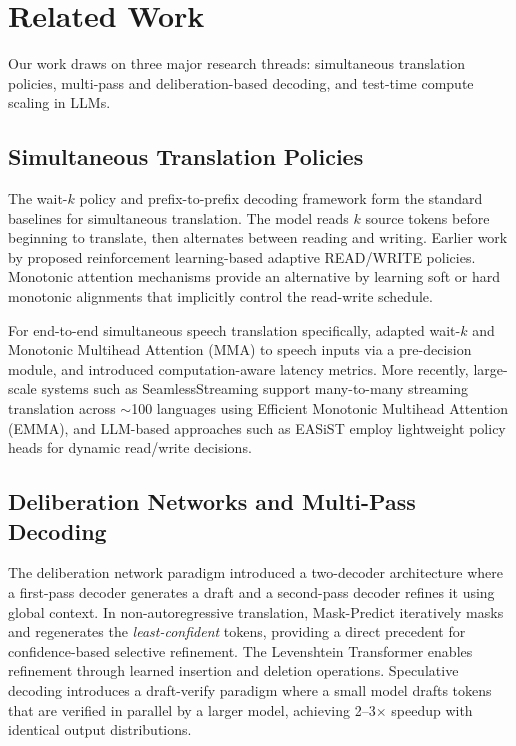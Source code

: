 \section{Related Work}

Our work draws on three major research threads: simultaneous translation policies, multi-pass and deliberation-based decoding, and test-time compute scaling in LLMs.

\subsection{Simultaneous Translation Policies}

The wait-$k$ policy \citep{ma2019stacl} and prefix-to-prefix decoding framework form the standard baselines for simultaneous translation. The model reads $k$ source tokens before beginning to translate, then alternates between reading and writing. Earlier work by \citet{gu2017learning} proposed reinforcement learning-based adaptive READ/WRITE policies. Monotonic attention mechanisms \citep{raffel2017monotonic, arivazhagan2019milk, ma2020mma} provide an alternative by learning soft or hard monotonic alignments that implicitly control the read-write schedule.

For end-to-end simultaneous speech translation specifically, \citet{ma2020simulst} adapted wait-$k$ and Monotonic Multihead Attention (MMA) to speech inputs via a pre-decision module, and introduced computation-aware latency metrics. More recently, large-scale systems such as SeamlessStreaming \citep{seamless2023} support many-to-many streaming translation across $\sim$100 languages using Efficient Monotonic Multihead Attention (EMMA), and LLM-based approaches such as EASiST \citep{fu2025easist} employ lightweight policy heads for dynamic read/write decisions.

\subsection{Deliberation Networks and Multi-Pass Decoding}

The deliberation network paradigm \citep{xia2017deliberation} introduced a two-decoder architecture where a first-pass decoder generates a draft and a second-pass decoder refines it using global context. In non-autoregressive translation, Mask-Predict \citep{ghazvininejad2019maskpredict} iteratively masks and regenerates the \emph{least-confident} tokens, providing a direct precedent for confidence-based selective refinement. The Levenshtein Transformer \citep{gu2019levenshtein} enables refinement through learned insertion and deletion operations. Speculative decoding \citep{leviathan2023speculative} introduces a draft-verify paradigm where a small model drafts tokens that are verified in parallel by a larger model, achieving 2--3$\times$ speedup with identical output distributions.

